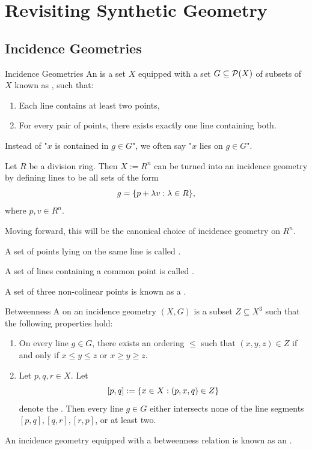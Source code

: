 \chapter{Revisiting Synthetic Geometry}
\section{Incidence Geometries}
\begin{importantdefinition}{Incidence Geometries}{}
	An  is a set $X$ equipped with a set $G \subseteq \mathcal{P}(X)$ of subsets of $X$ known as , such that:
	\begin{enumerate}
		\item Each line contains at least two points,
		\item For every pair of points, there exists exactly one line containing both.
	\end{enumerate}
\end{importantdefinition}
Instead of "$x$ is contained in $g \in G$", we often say "$x$ lies on $g \in G$".
\begin{exercise}
	Let $R$ be a division ring. Then $X := R^n$ can be turned into an incidence geometry by defining lines to be all sets of the form $$g = \qty{p + \lambda v : \lambda \in R},$$ where $p,v \in R^n$.
\end{exercise}
Moving forward, this will be the canonical choice of incidence geometry on $R^n$.
\begin{definition}
	A set of points lying on the same line is called .
\end{definition}
\begin{definition}
	A set of lines containing a common point is called .
\end{definition}
\begin{definition}
	A set of three non-colinear points is known as a .
\end{definition}
\begin{importantdefinition}{Betweenness}{}
	A  on an incidence geometry $(X,G)$ is a subset $Z \subseteq X^3$ such that the following properties hold:
	\begin{enumerate}
		\item {} On every line $g \in G$, there exists an ordering $\leq$ such that $(x,y,z) \in Z$ if and only if $x \leq y \leq z$ or $x \geq y \geq z$.
		\item {} Let $p,q,r \in X$. Let 
		$$[p,q] := \qty{x \in X : (p,x,q) \in Z}$$ denote the . Then every line $g \in G$ either intersects none of the line segments $[p,q], [q,r], [r,p]$, or at least two.
	\end{enumerate}
	An incidence geometry equipped with a betweenness relation is known as an .
\end{importantdefinition}
